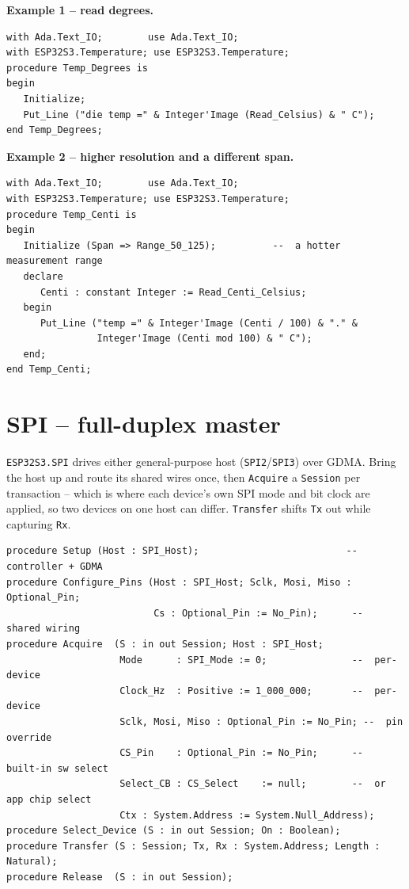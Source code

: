 \textbf{Example 1 -- read degrees.}
\begin{lstlisting}
with Ada.Text_IO;        use Ada.Text_IO;
with ESP32S3.Temperature; use ESP32S3.Temperature;
procedure Temp_Degrees is
begin
   Initialize;
   Put_Line ("die temp =" & Integer'Image (Read_Celsius) & " C");
end Temp_Degrees;
\end{lstlisting}

\textbf{Example 2 -- higher resolution and a different span.}
\begin{lstlisting}
with Ada.Text_IO;        use Ada.Text_IO;
with ESP32S3.Temperature; use ESP32S3.Temperature;
procedure Temp_Centi is
begin
   Initialize (Span => Range_50_125);          --  a hotter measurement range
   declare
      Centi : constant Integer := Read_Centi_Celsius;
   begin
      Put_Line ("temp =" & Integer'Image (Centi / 100) & "." &
                Integer'Image (Centi mod 100) & " C");
   end;
end Temp_Centi;
\end{lstlisting}

\section{SPI -- full-duplex master}

\texttt{ESP32S3.SPI} drives either general-purpose host (\texttt{SPI2}/\texttt{SPI3})
over GDMA. Bring the host up and route its shared wires once, then \texttt{Acquire}
a \texttt{Session} per transaction -- which is where each device's own SPI mode and
bit clock are applied, so two devices on one host can differ. \texttt{Transfer}
shifts \texttt{Tx} out while capturing \texttt{Rx}.

\begin{lstlisting}
procedure Setup (Host : SPI_Host);                          --  controller + GDMA
procedure Configure_Pins (Host : SPI_Host; Sclk, Mosi, Miso : Optional_Pin;
                          Cs : Optional_Pin := No_Pin);      --  shared wiring
procedure Acquire  (S : in out Session; Host : SPI_Host;
                    Mode      : SPI_Mode := 0;               --  per-device
                    Clock_Hz  : Positive := 1_000_000;       --  per-device
                    Sclk, Mosi, Miso : Optional_Pin := No_Pin; --  pin override
                    CS_Pin    : Optional_Pin := No_Pin;      --  built-in sw select
                    Select_CB : CS_Select    := null;        --  or app chip select
                    Ctx : System.Address := System.Null_Address);
procedure Select_Device (S : in out Session; On : Boolean);
procedure Transfer (S : Session; Tx, Rx : System.Address; Length : Natural);
procedure Release  (S : in out Session);
\end{lstlisting}

